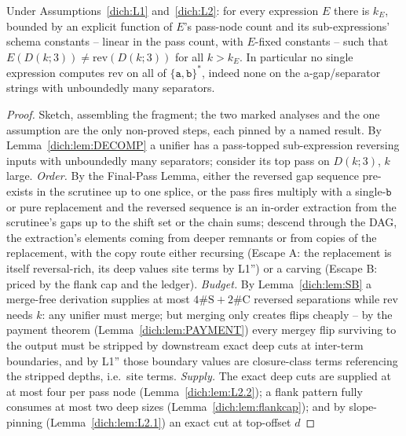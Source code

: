 \begin{theorem}
    \label{dich:thm:main}
    Under Assumptions~\ref{dich:L1} and~\ref{dich:L2}: for every
    expression $E$ there is $k_E$, bounded by an explicit function of
    $E$'s pass-node count and its sub-expressions' schema constants
    -- linear in the pass count, with $E$-fixed constants -- such that
    $E(D(k;3)) \ne \mathrm{rev}(D(k;3))$ for all $k > k_E$.  In
    particular no single expression computes $\mathrm{rev}$ on all of
    $\{\mathtt a, \mathtt b\}^*$, indeed none on the
    a-gap/separator strings with unboundedly many separators.
\end{theorem}

\begin{proof}
    Sketch, assembling the fragment; the two marked analyses and the
    one assumption are the only non-proved steps, each pinned by a
    named result.  By Lemma~\ref{dich:lem:DECOMP} a unifier has a
    pass-topped sub-expression reversing inputs with unboundedly many
    separators; consider its top pass on $D(k;3)$, $k$ large.
    \emph{Order.}  By the Final-Pass Lemma, either the reversed gap
    sequence pre-exists in the scrutinee up to one splice, or the pass
    fires multiply with a single-$\mathtt b$ or pure replacement and
    the reversed sequence is an in-order extraction from the
    scrutinee's gaps up to the shift set or the chain sums; descend
    through the DAG, the extraction's elements coming from deeper
    remnants or from copies of the replacement, with the copy route
    either recursing (Escape A: the replacement is itself
    reversal-rich, its deep values site terms by L1'') or a carving
    (Escape B: priced by the flank cap and the ledger).
    \emph{Budget.}  By Lemma~\ref{dich:lem:SB} a merge-free
    derivation supplies at most $4\#\mathrm{S} + 2\#\mathrm{C}$
    reversed separations while $\mathrm{rev}$ needs $k$: any unifier
    must merge; but merging only creates flips cheaply -- by the
    payment theorem (Lemma~\ref{dich:lem:PAYMENT}) every mergey flip
    surviving to the output must be stripped by downstream exact deep
    cuts at inter-term boundaries, and by L1'' those boundary values
    are closure-class terms referencing the stripped depths, i.e.\
    site terms.  \emph{Supply.}  The exact deep cuts are supplied at
    at most four per pass node (Lemma~\ref{dich:lem:L2.2}); a flank
    pattern fully consumes at most two deep sizes
    (Lemma~\ref{dich:lem:flankcap}); and by slope-pinning
    (Lemma~\ref{dich:lem:L2.1}) an exact cut at top-offset $d$

\end{proof}
